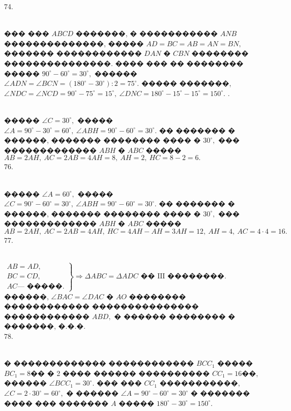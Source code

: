 \documentclass[12pt]{article}
\begin{document}
74.  \begin{figure}[ht!]
\end{figure}\\
��� ��� $ABCD$ �������, � ����������� $ANB$ ��������������, ����� $AD=BC=AB=AN=BN,$ ������� ������������ $DAN$ � $CBN$ �������� ���������������. ���� ��� �� �������� ����� $90^\circ-60^\circ=30^\circ,$ ������ $\angle ADN=\angle BCN=(180^\circ-30^\circ):2=75^\circ.$ ����� �������, $\angle NDC=\angle NCD=90^\circ-75^\circ=15^\circ,\ \angle DNC=180^\circ-15^\circ-15^\circ=150^\circ.$\newpage
{}. \begin{figure}[ht!]
\end{figure}\\
����� $\angle C=30^\circ,$ ����� $\angle A=90^\circ-30^\circ=60^\circ,\ \angle ABH=90^\circ-60^\circ=30^\circ.$ �� ������� � ������, ������� �������� ���� � $30^\circ,$ ��� ������������� $ABH$ � $ABC$ ����� $AB=2AH,\ AC=2AB=4AH=8,\ AH=2,\ HC=8-2=6.$\\
76. \begin{figure}[ht!]
\end{figure}\\
����� $\angle A=60^\circ,$ ����� $\angle C=90^\circ-60^\circ=30^\circ,\ \angle ABH=90^\circ-60^\circ=30^\circ.$ �� ������� � ������, ������� �������� ���� � $30^\circ,$ ��� ������������� $ABH$ � $ABC$ ����� $AB=2AH,\ AC=2AB=4AH,\ HC=4AH-AH=3AH=12,\ AH=4,\ AC=4\cdot4=16.$\\
77. \begin{figure}[ht!]
\end{figure}\\
$\left.\begin{array}{l}AB=AD,\\
BC=CD,\\
AC\text{--- �����.}  \end{array}\right\}\Rightarrow \Delta ABC=\Delta ADC\text{ �� III ��������.}$ ������, $\angle BAC=\angle DAC$ � $AO$ �������� ������������ ��������������� ������������ $ABD,$ � ������ �������� � �������, �.�.�.\\
78. \begin{figure}[ht!]
\end{figure}\\
� ������������� ������������ $BCC_1$ ����� $BC_1=8$�� � 2 ���� ������ ���������� $CC_1=16$��, ������ $\angle BCC_1=30^\circ.$ ��� ��� $CC_1$ �����������, $\angle C=2\cdot30^\circ=60^\circ,$ � ������ $\angle A=90^\circ-60^\circ=30^\circ$ � ������� ���� ��� ������� $A$ ����� $180^\circ-30^\circ=150^\circ.$\\
\end{document}
